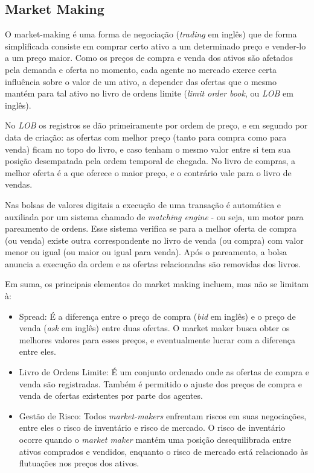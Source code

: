 \subsection{Market Making}
O market-making é uma forma de negociação (\textit{trading} em inglês) que de forma simplificada consiste em comprar certo ativo a um determinado preço e vender-lo a um preço maior.
Como os preços de compra e venda dos ativos são afetados pela demanda e oferta no momento, cada agente no mercado exerce certa influência sobre o valor de um ativo, a depender das ofertas que o mesmo mantém para tal ativo no livro de ordens limite (\textit{limit order book}, ou \textit{LOB} em inglês). 

No \textit{LOB} os registros se dão primeiramente por ordem de preço, e em segundo por data de criação: as ofertas com melhor preço (tanto para compra como para venda) ficam no topo do livro, e caso tenham o mesmo valor entre si tem sua posição desempatada pela ordem temporal de chegada. No livro de compras, a melhor oferta é a que oferece o maior preço, e o contrário vale para o livro de vendas.

Nas bolsas de valores digitais a execução de uma transação é automática e auxiliada por um sistema chamado de \textit{matching engine} - ou seja, um motor para pareamento de ordens. Esse sistema verifica se para a melhor oferta de compra (ou venda) existe outra correspondente no livro de venda (ou compra) com valor menor ou igual (ou maior ou igual para venda). Após o pareamento, a bolsa anuncia a execução da ordem e as ofertas relacionadas são removidas dos livros.

Em suma, os principais elementos do market making incluem, mas não se limitam à:

\begin{itemize}
	\item Spread: É a diferença entre o preço de compra (\textit{bid} em inglês) e o preço de venda (\textit{ask} em inglês) entre duas ofertas. O market maker busca obter os melhores valores para esses preços, e eventualmente lucrar com a diferença entre eles.
	
	\item Livro de Ordens Limite: É um conjunto ordenado onde as ofertas de compra e venda são registradas. Também é permitido o ajuste dos preços de compra e venda de ofertas existentes por parte dos agentes.
	
	\item Gestão de Risco: Todos \textit{market-makers} enfrentam riscos em suas negociações, entre eles o risco de inventário e risco de mercado. O risco de inventário ocorre quando o \textit{market maker} mantém uma posição desequilibrada entre ativos comprados e vendidos, enquanto o risco de mercado está relacionado às flutuações nos preços dos ativos.
\end{itemize}

